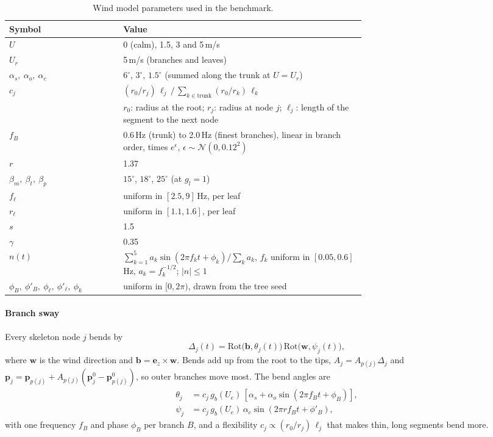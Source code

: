 \documentclass[preprint,11pt,authoryear]{elsarticle}
\begin{document}
\begin{table}[!tbp]
\centering\small
\caption{Wind model parameters used in the benchmark.}
\label{tab:windparams}
\begin{tabular}{@{}lp{0.68\linewidth}@{}}
\toprule
Symbol & Value \\
\midrule
$U$ & 0 (calm), 1.5, 3 and 5\,m/s \\
$U_r$ & 5\,m/s (branches and leaves) \\
$\alpha_s,\ \alpha_o,\ \alpha_c$ & $6^\circ$, $3^\circ$, $1.5^\circ$ (summed along the trunk at $U=U_r$) \\
$c_j$ & $(r_0/r_j)\,\ell_j \,/\, \sum_{k\in\text{trunk}} (r_0/r_k)\,\ell_k$ \\
 & $r_0$: radius at the root; $r_j$: radius at node $j$; $\ell_j$: length of the segment to the next node \\
$f_B$ & 0.6\,Hz (trunk) to 2.0\,Hz (finest branches), linear in branch order, times $e^{\epsilon}$, $\epsilon\sim\mathcal N(0, 0.12^2)$ \\
$r$ & 1.37 \\
$\beta_m,\ \beta_t,\ \beta_p$ & $15^\circ$, $18^\circ$, $25^\circ$ (at $g_l = 1$) \\
$f_\ell$ & uniform in $[2.5, 9]$\,Hz, per leaf \\
$r_\ell$ & uniform in $[1.1, 1.6]$, per leaf \\
$s$ & 1.5 \\
$\gamma$ & 0.35 \\
$n(t)$ & $\sum_{k=1}^{5} a_k \sin(2\pi f_k t + \phi_k) / \sum_k a_k$, $f_k$ uniform in $[0.05, 0.6]$\,Hz, $a_k = f_k^{-1/2}$; $|n|\le 1$ \\
$\phi_B,\ \phi'_B,\ \phi_\ell,\ \phi'_\ell,\ \phi_k$ & uniform in $[0, 2\pi)$, drawn from the tree seed \\
\bottomrule
\end{tabular}
\end{table}

\paragraph{Branch sway} Every skeleton node $j$ bends by
\begin{equation}
\Delta_j(t) = \mathrm{Rot}\big(\mathbf b, \theta_j(t)\big)\,\mathrm{Rot}\big(\mathbf w, \psi_j(t)\big),
\end{equation}
where $\mathbf w$ is the wind direction and $\mathbf b = \mathbf e_z \times \mathbf w$. Bends add up from the root to the tips, $A_j = A_{p(j)}\Delta_j$ and $\mathbf p_j = \mathbf p_{p(j)} + A_{p(j)}(\mathbf p_j^0 - \mathbf p_{p(j)}^0)$, so outer branches move most. The bend angles are
\begin{align}
\theta_j &= c_j\, g_b(U_e)\,[\alpha_s + \alpha_o \sin(2\pi f_{B}t + \phi_{B})], \\
\psi_j &= c_j\, g_b(U_e)\,\alpha_c \sin(2\pi r f_{B} t + \phi'_{B}),
\end{align}
with one frequency $f_B$ and phase $\phi_B$ per branch $B$, and a flexibility $c_j \propto (r_0/r_j)\,\ell_j$ that makes thin, long segments bend more.
\end{document}
